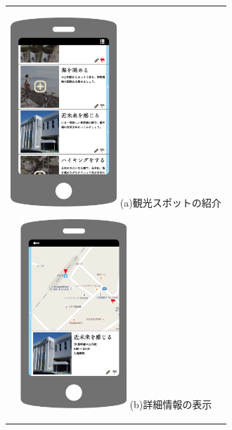 \begin{figure}[htbp]
  \begin{center}
    \begin{tabular}{c}

      \begin{minipage}{0.33\hsize}
        \begin{center}
\includegraphics[width=4cm, bb=0 0 320 552]{appIdea1.png}
          \hspace{1cm} %
          {\footnotesize (a)観光スポットの紹介}
        \end{center}
      \end{minipage}

      \begin{minipage}{0.33\hsize}
        \begin{center}
\includegraphics[width=4cm, bb=0 0 321 547]{appIdea2.png}
          \hspace{1cm} %
          {\footnotesize (b)詳細情報の表示}
        \end{center}
      \end{minipage}


\end{tabular}
\end{center}
\end{figure}

